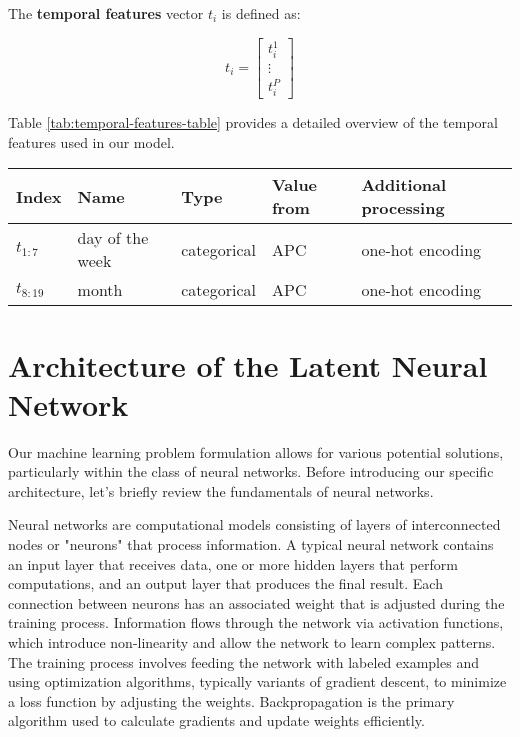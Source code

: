 The \textbf{temporal features} vector $t_i$ is defined as:

\[
    t_i = \begin{bmatrix}
        t_i^1  \\
        \vdots \\
        t_i^P
    \end{bmatrix}
\]

Table \ref{tab:temporal-features-table} provides a detailed overview of the temporal features used in our model.

\begin{table*}[h!]
    \caption{Overview of temporal features used in the feature vector.}
    \label{tab:temporal-features-table}
    \begin{tabular}{p{1cm} p{3.5cm} p{1.8cm} p{3.5cm} p{4.5cm}}
        \toprule
        \textbf{Index} & \textbf{Name}   & \textbf{Type} & \textbf{Value from} & \textbf{Additional processing} \\
        \midrule
        $t_{1:7}$      & day of the week & categorical   & \acrfull{APC}       & one-hot encoding               \\
        $t_{8:19}$     & month           & categorical   & \acrfull{APC}       & one-hot encoding               \\
        \bottomrule
    \end{tabular}
\end{table*}

\section{Architecture of the Latent Neural Network}

Our machine learning problem formulation allows for various potential solutions, particularly within the class of neural networks. Before introducing our specific architecture, let's briefly review the fundamentals of neural networks.

Neural networks are computational models consisting of layers of interconnected nodes or "neurons" that process information. A typical neural network contains an input layer that receives data, one or more hidden layers that perform computations, and an output layer that produces the final result. Each connection between neurons has an associated weight that is adjusted during the training process. Information flows through the network via activation functions, which introduce non-linearity and allow the network to learn complex patterns. The training process involves feeding the network with labeled examples and using optimization algorithms, typically variants of gradient descent, to minimize a loss function by adjusting the weights. Backpropagation is the primary algorithm used to calculate gradients and update weights efficiently.

